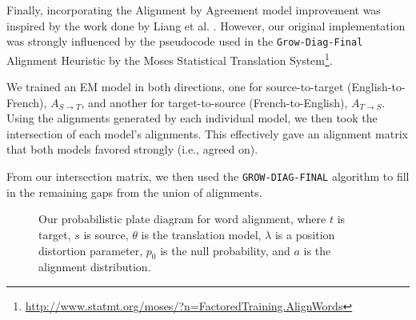 \documentclass[twoside,twocolumn]{article}
\begin{document}
Finally, incorporating the Alignment by Agreement model improvement was
inspired by the work done by Liang et al. \cite{liang2006alignment}. However,
our original implementation was strongly influenced by the pseudocode used in
the \texttt{Grow-Diag-Final} Alignment Heuristic by the Moses Statistical
Translation
System\footnote{\url{http://www.statmt.org/moses/?n=FactoredTraining.AlignWords}}.

We trained an EM model in both directions, one for source-to-target
(English-to-French), $A_{S \rightarrow T}$, and another for target-to-source
(French-to-English), $A_{T \rightarrow S}$.
Using the alignments generated by each individual model, we then took the intersection of each model's alignments. This effectively gave an alignment
matrix that both models favored strongly (i.e., agreed on).


From our intersection matrix, we then used the \texttt{GROW-DIAG-FINAL}
algorithm to fill in the remaining gaps from the union of alignments.

\begin{figure}
\centering
{}
\caption{Our probabilistic plate diagram for word alignment, where $t$ is
target, $s$ is source, $\theta$ is the translation model, $\lambda$ is a
position distortion parameter, $p_0$ is the null probability, and $a$ is the
alignment distribution.}
\end{figure}
\end{document}
